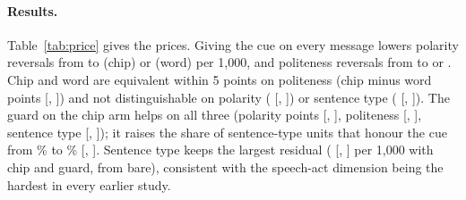 \paragraph{Results.}
Table~\ref{tab:price} gives the prices. Giving the cue on every message lowers polarity reversals from \jmfOneRevPolBare{} to \jmfOneRevPolChip{} (chip) or \jmfOneRevPolWord{} (word) per 1,000, and politeness reversals from \jmfOneRevPoliteBare{} to \jmfOneRevPoliteChip{} or \jmfOneRevPoliteWord{}. Chip and word are equivalent within 5 points on politeness (chip minus word \jmfOneChipMinusWordPolite{} points [\jmfOneChipMinusWordPoliteLo{}, \jmfOneChipMinusWordPoliteHi{}]) and not distinguishable on polarity (\jmfOneChipMinusWordPol{} [\jmfOneChipMinusWordPolLo{}, \jmfOneChipMinusWordPolHi{}]) or sentence type (\jmfOneChipMinusWordAct{} [\jmfOneChipMinusWordActLo{}, \jmfOneChipMinusWordActHi{}]). The guard on the chip arm helps on all three (polarity \jmfOneGuardGainPol{} points [\jmfOneGuardGainPolLo{}, \jmfOneGuardGainPolHi{}], politeness \jmfOneGuardGainPolite{} [\jmfOneGuardGainPoliteLo{}, \jmfOneGuardGainPoliteHi{}], sentence type \jmfOneGuardGainAct{} [\jmfOneGuardGainActLo{}, \jmfOneGuardGainActHi{}]); it raises the share of sentence-type units that honour the cue from \jmfOneRestActChip{}\% to \jmfOneRestActChipG{}\% [\jmfOneRestActChipGLo{}, \jmfOneRestActChipGHi{}]. Sentence type keeps the largest residual (\jmfOneRevActChipG{} [\jmfOneRevActChipGLo{}, \jmfOneRevActChipGHi{}] per 1,000 with chip and guard, from \jmfOneRevActBare{} bare), consistent with the speech-act dimension being the hardest in every earlier study.

